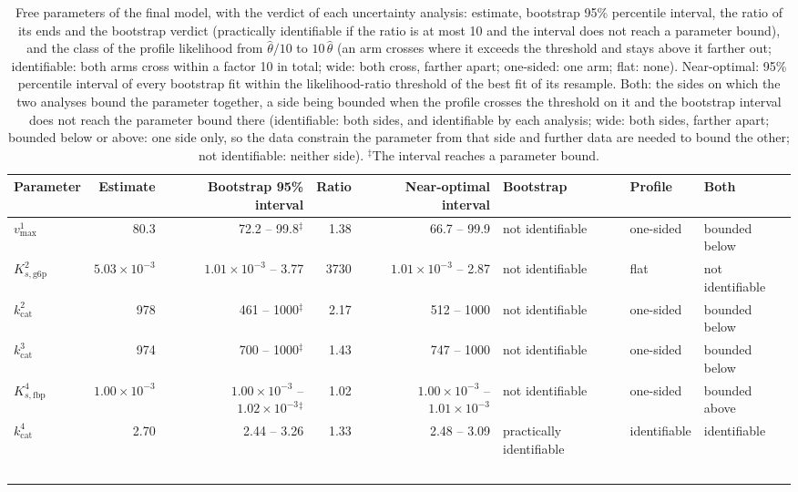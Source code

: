 \begin{table}[h]
\centering
\caption{Free parameters of the final model, with the verdict of each uncertainty analysis: estimate, bootstrap 95\% percentile interval, the ratio of its ends and the bootstrap verdict (practically identifiable if the ratio is at most 10 and the interval does not reach a parameter bound), and the class of the profile likelihood from $\hat\theta/10$ to $10\,\hat\theta$ (an arm crosses where it exceeds the threshold and stays above it farther out; identifiable: both arms cross within a factor 10 in total; wide: both cross, farther apart; one-sided: one arm; flat: none). Near-optimal: 95\% percentile interval of every bootstrap fit within the likelihood-ratio threshold of the best fit of its resample. Both: the sides on which the two analyses bound the parameter together, a side being bounded when the profile crosses the threshold on it and the bootstrap interval does not reach the parameter bound there (identifiable: both sides, and identifiable by each analysis; wide: both sides, farther apart; bounded below or above: one side only, so the data constrain the parameter from that side and further data are needed to bound the other; not identifiable: neither side). $^\ddagger$The interval reaches a parameter bound.}
\label{tab:free_parameters}
\begin{tabular}{lrrrrlll}
\toprule
Parameter & Estimate & Bootstrap 95\% interval & Ratio & Near-optimal interval & Bootstrap & Profile & Both \\
\midrule
$v_{\max}^{1}$ & 80.3 & 72.2 -- 99.8$^\ddagger$ & 1.38 & 66.7 -- 99.9 & not identifiable & one-sided & bounded below \\
$K_{s,\mathrm{g6p}}^{2}$ & $5.03 \times 10^{-3}$ & $1.01 \times 10^{-3}$ -- 3.77 & 3730 & $1.01 \times 10^{-3}$ -- 2.87 & not identifiable & flat & not identifiable \\
$k_{\mathrm{cat}}^{2}$ & 978 & 461 -- 1000$^\ddagger$ & 2.17 & 512 -- 1000 & not identifiable & one-sided & bounded below \\
$k_{\mathrm{cat}}^{3}$ & 974 & 700 -- 1000$^\ddagger$ & 1.43 & 747 -- 1000 & not identifiable & one-sided & bounded below \\
$K_{s,\mathrm{fbp}}^{4}$ & $1.00 \times 10^{-3}$ & $1.00 \times 10^{-3}$ -- $1.02 \times 10^{-3}$$^\ddagger$ & 1.02 & $1.00 \times 10^{-3}$ -- $1.01 \times 10^{-3}$ & not identifiable & one-sided & bounded above \\
$k_{\mathrm{cat}}^{4}$ & 2.70 & 2.44 -- 3.26 & 1.33 & 2.48 -- 3.09 & practically identifiable & identifiable & identifiable \\
$$
\end{tabular}
\end{table}
